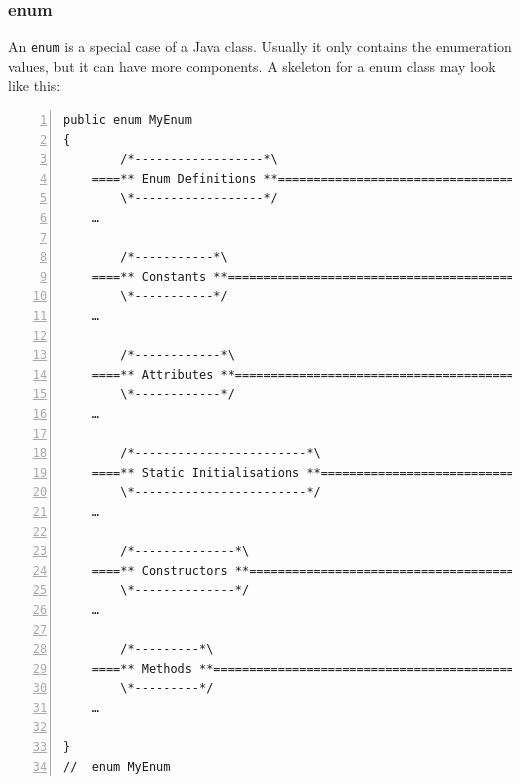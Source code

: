 \documentclass[12pt,a4paper,titlepage, parskip=half, headsepline, footsepline, cleardoubleplain]{scrbook}
\begin{document}
\subsubsection{enum}
An \lstinline|enum| is a special case of a Java class. Usually it only contains the enumeration values, but it can have more components. A skeleton for a enum class may look like this:

\begin{lstlisting}[numbers=left,caption={enum Skeleton}]
public enum MyEnum 
{
        /*------------------*\
    ====** Enum Definitions **=======================================
        \*------------------*/
    …
        
        /*-----------*\
    ====** Constants **==============================================
        \*-----------*/
    …
        
        /*------------*\
    ====** Attributes **=============================================
        \*------------*/
    …
        
        /*------------------------*\
    ====** Static Initialisations **=================================
        \*------------------------*/
    …
        
        /*--------------*\
    ====** Constructors **===========================================
        \*--------------*/
    …
        
        /*---------*\
    ====** Methods **================================================
        \*---------*/
    …
                
}
//  enum MyEnum
\end{lstlisting}
 
\end{document}
